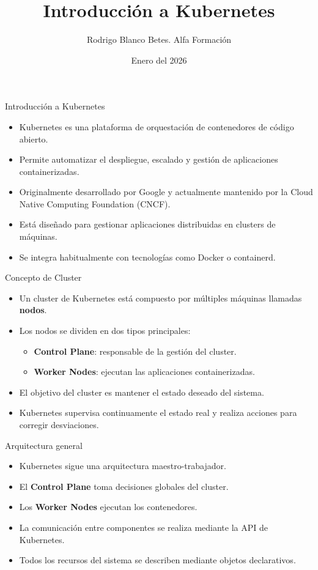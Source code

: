 \documentclass{beamer}
\title{Introducción a Kubernetes}
\author{Rodrigo Blanco Betes. Alfa Formación}
\date{Enero del 2026}
\begin{document}
\titlepage

\tableofcontents

\begin{frame}{Introducción a Kubernetes}
\begin{itemize}
\item Kubernetes es una plataforma de orquestación de contenedores de código abierto.
\item Permite automatizar el despliegue, escalado y gestión de aplicaciones containerizadas.
\item Originalmente desarrollado por Google y actualmente mantenido por la Cloud Native Computing Foundation (CNCF).
\item Está diseñado para gestionar aplicaciones distribuidas en clusters de máquinas.
\item Se integra habitualmente con tecnologías como Docker o containerd.
\end{itemize}
\end{frame}

\begin{frame}{Concepto de Cluster}
\begin{itemize}
\item Un cluster de Kubernetes está compuesto por múltiples máquinas llamadas \textbf{nodos}.
\item Los nodos se dividen en dos tipos principales:
\begin{itemize}
\item \textbf{Control Plane}: responsable de la gestión del cluster.
\item \textbf{Worker Nodes}: ejecutan las aplicaciones containerizadas.
\end{itemize}
\item El objetivo del cluster es mantener el estado deseado del sistema.
\item Kubernetes supervisa continuamente el estado real y realiza acciones para corregir desviaciones.
\end{itemize}
\end{frame}

\begin{frame}{Arquitectura general}
\begin{itemize}
\item Kubernetes sigue una arquitectura maestro-trabajador.
\item El \textbf{Control Plane} toma decisiones globales del cluster.
\item Los \textbf{Worker Nodes} ejecutan los contenedores.
\item La comunicación entre componentes se realiza mediante la API de Kubernetes.
\item Todos los recursos del sistema se describen mediante objetos declarativos.
\end{itemize}
\end{frame}
\end{document}

